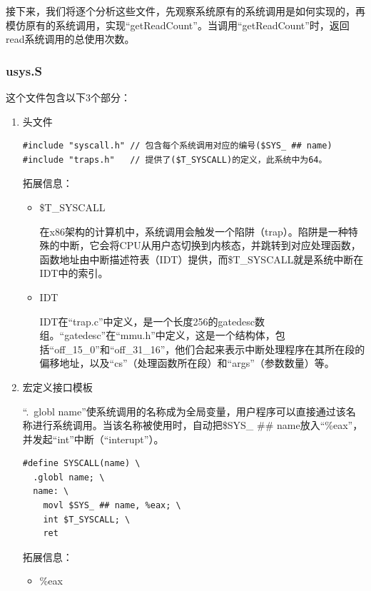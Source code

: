 \documentclass[fontset=ubuntu]{ctexart}
\begin{document}
接下来，我们将逐个分析这些文件，先观察系统原有的系统调用是如何实现的，再模仿原有的系统调用，实现“getReadCount”。当调用“getReadCount”时，返回read系统调用的总使用次数。

\newpage
\subsubsection{usys.S}

这个文件包含以下3个部分：

\begin{enumerate}
    \item 头文件
          \begin{lstlisting}
#include "syscall.h" // 包含每个系统调用对应的编号($SYS_ ## name)
#include "traps.h"   // 提供了($T_SYSCALL)的定义，此系统中为64。
    \end{lstlisting}
          \noindent 拓展信息：
          \vspace{-0.3cm}
          \begin{itemize}[listparindent=2em]
              \item \$T\_SYSCALL

                    在x86架构的计算机中，系统调用会触发一个陷阱（trap）。陷阱是一种特殊的中断，它会将CPU从用户态切换到内核态，并跳转到对应处理函数，函数地址由中断描述符表（IDT）提供，而\$T\_SYSCALL就是系统中断在IDT中的索引。
              \item IDT

                    IDT在“trap.c”中定义，是一个长度256的gatedesc数组。“gatedesc”在“mmu.h”中定义，这是一个结构体，包括“off\_15\_0”和“off\_31\_16”，他们合起来表示中断处理程序在其所在段的偏移地址，以及“cs”（处理函数所在段）和“args”（参数数量）等。
          \end{itemize}
    \item 宏定义接口模板

          “.\ globl name”使系统调用的名称成为全局变量，用户程序可以直接通过该名称进行系统调用。当该名称被使用时，自动把\$SYS\_ \#\# name放入“\%eax”，并发起“int”中断（“interupt”）。
          \begin{lstlisting}[language={[x86masm]Assembler}]
#define SYSCALL(name) \
  .globl name; \
  name: \
    movl $SYS_ ## name, %eax; \
    int $T_SYSCALL; \
    ret
    \end{lstlisting}
          \noindent 拓展信息：
          \vspace{-0.3cm}
          \begin{itemize}[listparindent=2em]
              \item \%eax


\end{itemize}
\end{enumerate}
\end{document}
